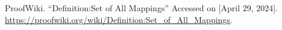 \begin{thebibliography}{99}


ProofWiki. ``Definition:Set of All Mappings'' Accessed on [April 29, 2024]. \url{https://proofwiki.org/wiki/Definition:Set_of_All_Mappings}.

\end{thebibliography}
